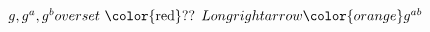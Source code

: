 \documentclass[preview]{standalone}
\begin{document}
\begin{center}
$g, g^a, g^b \\overset{\text{ {\color{red}??} } } {\\Longrightarrow} {\color{orange}g^{ab} }$
\end{center}
\end{document}
